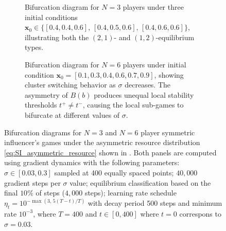 \documentclass{article}
\begin{document}
                \begin{figure}[ht!]
                    \centering
                    \begin{subfigure}[b]{0.9\linewidth}
                        \centering
                        
                        \caption{Bifurcation diagram for $N=3$ players under three initial conditions $\mathbf{x}_0 \in \{[0.4, 0.4, 0.6],\, [0.4, 0.5, 0.6],\, [0.4, 0.6, 0.6]\}$, illustrating both the $(2,1)$- and $(1,2)$-equilibrium types.}
                        \label{fig:asymm_bifurcation:b}
                        \vspace{4ex}
                    \end{subfigure}
                    \begin{subfigure}[b]{0.9\linewidth}
                        \centering
                        
                        \caption{Bifurcation diagram for $N = 6$ players under initial condition $\mathbf{x}_0 = [0.1, 0.3, 0.4, 0.6, 0.7, 0.9]$, showing cluster switching behavior as $\sigma$ decreases. The asymmetry of $B(b)$ produces unequal local stability thresholds $t^+ \neq t^-$, causing the local sub-games to bifurcate at different values of $\sigma$.}
                        \label{fig:asymm_bifurcation:c}
                        \vspace{4ex}
                    \end{subfigure}
                    \caption{Bifurcation diagrams for $N = 3$ and $N = 6$ player symmetric 
                        influencer's games under the asymmetric resource distribution 
                        \cref{eq:SI_asymmetric_resource} shown in . 
                        Both panels are computed using gradient dynamics with the following 
                        parameters: $\sigma \in [0.03, 0.3]$ sampled at 400 equally spaced points; 
                        $40{,}000$ gradient steps per $\sigma$ value; equilibrium classification 
                        based on the final $10\%$ of steps ($4{,}000$ steps); learning rate schedule 
                        $\eta_t = 10^{-\max(3,\,5(T-t)/T)}$ with decay period 500 steps and minimum rate $10^{-3}$, where $T = 400$ and $t\in[0,400]$ where $t=0$ correspons to $\sigma=0.03$. }
                    \label{fig:asymm_bifurcation}
                \end{figure}
                \clearpage
\end{document}
